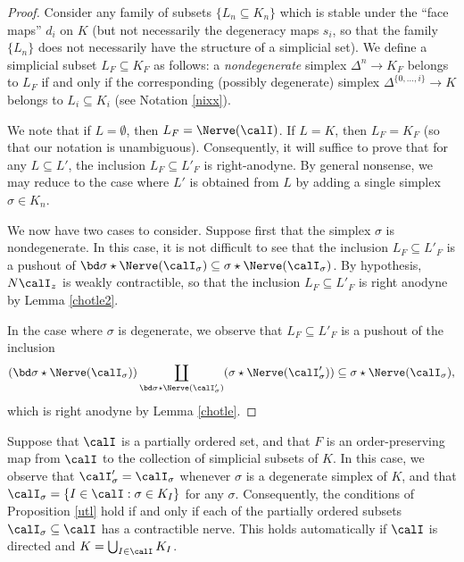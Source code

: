 \begin{proof}
Consider any family of subsets $\{ L_{n} \subseteq K_{n}\}$ which is
stable under the ``face maps'' $d_i$ on $K$ (but not necessarily
the degeneracy maps $s_i$, so that the family $\{ L_{n} \}$ does
not necessarily have the structure of a simplicial set). We define
a simplicial subset $L_{F} \subseteq K_F$ as follows: a {\em nondegenerate} simplex
$\Delta^n \rightarrow K_{F}$ belongs to $L_{F}$ if and only if the
corresponding (possibly degenerate) simplex $\Delta^{ \{0, \ldots, i\} } \rightarrow K$ belongs to
$L_i \subseteq K_i$ (see Notation \ref{nixx}). 

We note that if $L = \emptyset$, then $L_{F} = \Nerve(\calI)$. If $L = K$, then $L_{F}= K_{F}$ (so that our notation is unambiguous).
Consequently, it will suffice to prove that for any $L \subseteq
L'$, the inclusion $L_{F} \subseteq L'_{F}$ is right-anodyne. By
general nonsense, we may reduce to the case where $L'$ is obtained
from $L$ by adding a single simplex $\sigma \in K_n$.

We now have two cases to consider. Suppose first that the simplex
$\sigma$ is nondegenerate. In this case, it is not difficult to see
that the inclusion $L_{F} \subseteq L'_{F}$ is a pushout of $ \bd
\sigma \star \Nerve(\calI_{\sigma}) \subseteq \sigma \star \Nerve(\calI_{\sigma})$. By hypothesis,
$N \calI_{z}$ is weakly contractible, so that the inclusion $L_{F}
\subseteq L'_{F}$ is right anodyne by Lemma \ref{chotle2}.

In the case where $\sigma$ is degenerate, we observe that $L_{F}
\subseteq L'_{F}$ is a pushout of the inclusion
$$ (\bd \sigma \star \Nerve( \calI_{\sigma} )) \coprod_{ \bd \sigma \star \Nerve(\calI'_{\sigma})} (\sigma \star \Nerve(\calI'_{\sigma})) \subseteq \sigma
\star \Nerve( \calI_{\sigma} ),$$ which is right anodyne by Lemma
\ref{chotle}.
\end{proof}

\begin{remark}
Suppose that $\calI$ is a partially ordered set, and that $F$ is
an order-preserving map from $\calI$ to the collection of
simplicial subsets of $K$. In this case, we observe that
$\calI'_{\sigma} = \calI_{\sigma}$ whenever $\sigma$ is a degenerate simplex of $K$, and that
$\calI_{\sigma} = \{ I \in \calI: \sigma \in K_I \}$ for any $\sigma$. Consequently, the
conditions of Proposition \ref{utl} hold if and only if each of
the partially ordered subsets $\calI_{\sigma} \subseteq \calI$ has a
contractible nerve. This holds automatically if $\calI$ is
directed and $K = \bigcup_{I \in \calI} K_I$.
\end{remark}


